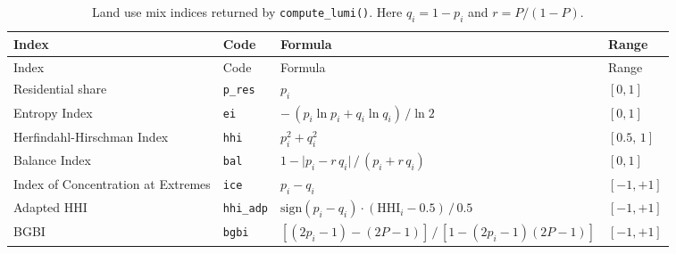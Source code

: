 \begin{longtable}[]{@{}
  >{\centering\arraybackslash}p{}
  >{\centering\arraybackslash}p{}
  >{\centering\arraybackslash}p{}
  >{\centering\arraybackslash}p{}@{}}
\caption{\label{tab:lumi-table} Land use mix indices returned by \protect\texttt{compute\_lumi()}.
Here \(q_i = 1 - p_i\) and \(r = P/(1-P)\).}\tabularnewline
\toprule\noalign{}
\begin{minipage}[b]{\linewidth}\centering
Index
\end{minipage} & \begin{minipage}[b]{\linewidth}\centering
Code
\end{minipage} & \begin{minipage}[b]{\linewidth}\centering
Formula
\end{minipage} & \begin{minipage}[b]{\linewidth}\centering
Range
\end{minipage} \\
\midrule\noalign{}
\endfirsthead
\toprule\noalign{}
\begin{minipage}[b]{\linewidth}\centering
Index
\end{minipage} & \begin{minipage}[b]{\linewidth}\centering
Code
\end{minipage} & \begin{minipage}[b]{\linewidth}\centering
Formula
\end{minipage} & \begin{minipage}[b]{\linewidth}\centering
Range
\end{minipage} \\
\midrule\noalign{}
\endhead
\bottomrule\noalign{}
\endlastfoot
Residential share & \texttt{p\_res} & \(p_i\) & \([0,1]\) \\
Entropy Index & \texttt{ei} & \(-\,(p_i \ln p_i + q_i \ln q_i)\,/\ln 2\) & \([0,1]\) \\
Herfindahl-Hirschman Index & \texttt{hhi} & \(p_i^2 + q_i^2\) & \([0.5,\,1]\) \\
Balance Index & \texttt{bal} & \(1 - \lvert p_i - r\,q_i\rvert\,/\,(p_i + r\,q_i)\) & \([0,1]\) \\
Index of Concentration at Extremes & \texttt{ice} & \(p_i - q_i\) & \([-1,+1]\) \\
Adapted HHI & \texttt{hhi\_adp} & \(\mathrm{sign}(p_i - q_i)\cdot(\mathrm{HHI}_i - 0.5)\,/\,0.5\) & \([-1,+1]\) \\
BGBI & \texttt{bgbi} & \([(2p_i-1)-(2P-1)]\,/\,[1-(2p_i-1)(2P-1)]\) & \([-1,+1]\) \\
\end{longtable}

